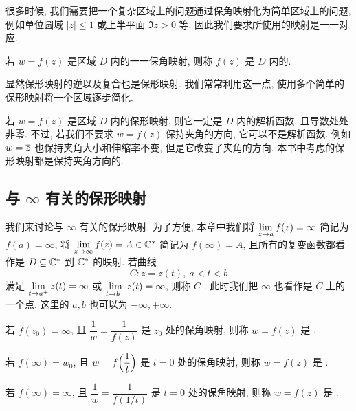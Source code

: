 很多时候, 我们需要把一个复杂区域上的问题通过保角映射化为简单区域上的问题, 例如单位圆域 $|z|\le1$ 或上半平面 $\Im z>0$ 等.
因此我们要求所使用的映射是一一对应.

\begin{definition}
  若 $w=f(z)$ 是区域 $D$ 内的一一保角映射, 则称 $f(z)$ 是 $D$ 内的.\footnotemark
\end{definition}

显然保形映射的逆以及复合也是保形映射.
我们常常利用这一点, 使用多个简单的保形映射将一个区域逐步简化.

若 $w=f(z)$ 是区域 $D$ 内的保形映射, 则它一定是 $D$ 内的解析函数, 且导数处处非零.
不过, 若我们不要求 $w=f(z)$ 保持夹角的方向, 它可以不是解析函数.
例如 $w=\overline z$ 也保持夹角大小和伸缩率不变, 但是它改变了夹角的方向.
\alert{本书中考虑的保形映射都是保持夹角方向的}.


\subsection{与 \texorpdfstring{$\infty$}{∞} 有关的保形映射}

我们来讨论与 $\infty$ 有关的保形映射.
为了方便, 本章中我们将 $\lim\limits_{z\rightarrow a}f(z)=\infty$ 简记为 $f(a)=\infty$, 将 $\lim\limits_{z\rightarrow \infty}f(z)=A\in{\mathbb{C}}^*$ 简记为 $f(\infty)=A$, 且所有的复变函数都看作是 $D\subseteq{\mathbb{C}}^*$ 到 ${\mathbb{C}}^*$ 的映射.
若曲线
\[
  C: z=z(t),\ a<t<b
\]
满足 $\lim\limits_{t\rightarrow a^+}z(t)=\infty$ 或 $\lim\limits_{t\rightarrow b^-}z(t)=\infty$, 则称 $C$ .
此时我们把 $\infty$ 也看作是 $C$ 上的一个点.
这里的 $a,b$ 也可以为 $-\infty,+\infty$.


\begin{definition}
  \begin{enuma}
    \item 若 $f(z_0)=\infty$, 且 $\dfrac1w=\dfrac1{f(z)}$ 是 $z_0$ 处的保角映射, 则称 $w=f(z)$ 是 .
    \item 若 $f(\infty)=w_0$, 且 $w=f\Bigl(\dfrac1t\Bigr)$ 是 $t=0$ 处的保角映射, 则称 $w=f(z)$ 是 .
    \item 若 $f(\infty)=\infty$, 且 $\dfrac1w=\dfrac1{f(1/t)}$ 是 $t=0$ 处的保角映射, 则称 $w=f(z)$ 是 .
  \end{enuma}
\end{definition}


